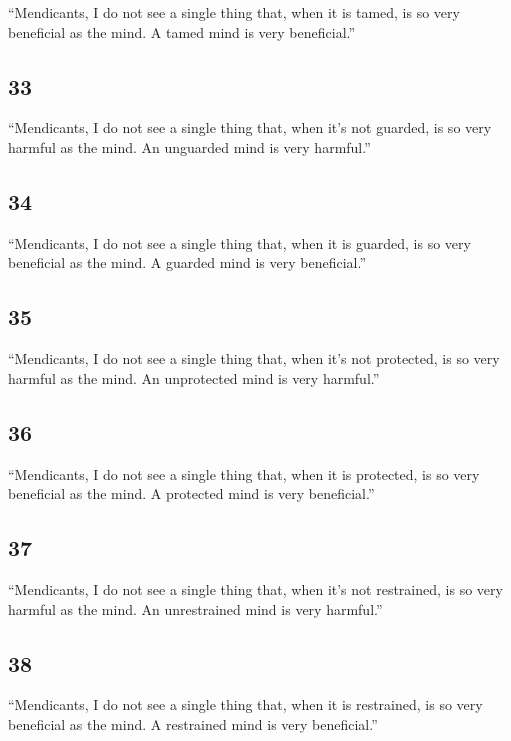 \documentclass[12pt,openany]{book}%
\begin{document}
“Mendicants, I do not see a single thing that, when it is tamed, is so very beneficial as the mind. A tamed mind is very beneficial.” 

\subsection*{33 }

“Mendicants, I do not see a single thing that, when it’s not guarded, is so very harmful as the mind. An unguarded mind is very harmful.” 

\subsection*{34 }

“Mendicants, I do not see a single thing that, when it is guarded, is so very beneficial as the mind. A guarded mind is very beneficial.” 

\subsection*{35 }

“Mendicants, I do not see a single thing that, when it’s not protected, is so very harmful as the mind. An unprotected mind is very harmful.” 

\subsection*{36 }

“Mendicants, I do not see a single thing that, when it is protected, is so very beneficial as the mind. A protected mind is very beneficial.” 

\subsection*{37 }

“Mendicants, I do not see a single thing that, when it’s not restrained, is so very harmful as the mind. An unrestrained mind is very harmful.” 

\subsection*{38 }

“Mendicants, I do not see a single thing that, when it is restrained, is so very beneficial as the mind. A restrained mind is very beneficial.” 
\end{document}
